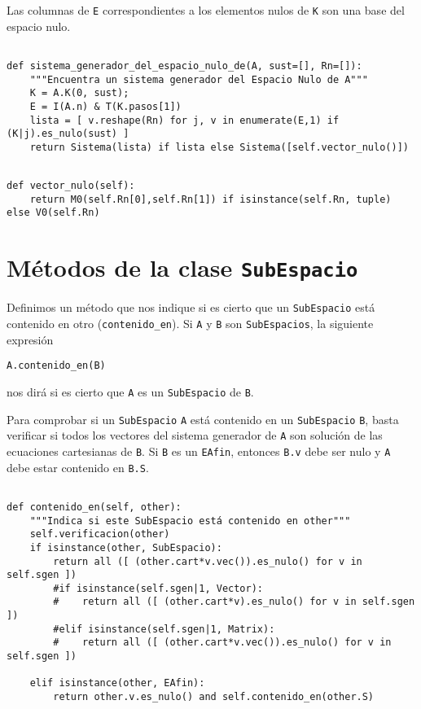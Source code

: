 \documentclass[11pt]{report}
\begin{document}
Las columnas de \texttt{E} correspondientes a los elementos nulos de \texttt{K} son
una base del espacio nulo.

\begin{verbatim}

def sistema_generador_del_espacio_nulo_de(A, sust=[], Rn=[]):
    """Encuentra un sistema generador del Espacio Nulo de A"""
    K = A.K(0, sust);
    E = I(A.n) & T(K.pasos[1])
    lista = [ v.reshape(Rn) for j, v in enumerate(E,1) if (K|j).es_nulo(sust) ]
    return Sistema(lista) if lista else Sistema([self.vector_nulo()])

\end{verbatim}

\begin{verbatim}

def vector_nulo(self):
    return M0(self.Rn[0],self.Rn[1]) if isinstance(self.Rn, tuple) else V0(self.Rn)

\end{verbatim}

\section{Métodos de la clase \texttt{SubEspacio}}
\label{sec:org3bdbb15}
Definimos un método que nos indique si es cierto que un \texttt{SubEspacio}
está contenido en otro (\texttt{contenido\_en}). Si \texttt{A} y \texttt{B} son
\texttt{SubEspacios}, la siguiente expresión
\begin{center}
  \Verb/A.contenido_en(B)/
\end{center}
nos dirá si es cierto que \texttt{A} es un \texttt{SubEspacio} de \texttt{B}.

Para comprobar si un \texttt{SubEspacio} \texttt{A} está contenido en un
\texttt{SubEspacio} \texttt{B}, basta verificar si todos los vectores del sistema
generador de \texttt{A} son solución de las ecuaciones cartesianas de \texttt{B}. Si
\texttt{B} es un \texttt{EAfin}, entonces \texttt{B.v} debe ser nulo y \texttt{A} debe estar
contenido en \texttt{B.S}.

\begin{verbatim}

def contenido_en(self, other):
    """Indica si este SubEspacio está contenido en other"""
    self.verificacion(other)
    if isinstance(other, SubEspacio):
        return all ([ (other.cart*v.vec()).es_nulo() for v in self.sgen ])
        #if isinstance(self.sgen|1, Vector):
        #    return all ([ (other.cart*v).es_nulo() for v in self.sgen ])
        #elif isinstance(self.sgen|1, Matrix):
        #    return all ([ (other.cart*v.vec()).es_nulo() for v in self.sgen ])
        
    elif isinstance(other, EAfin):
        return other.v.es_nulo() and self.contenido_en(other.S)

\end{verbatim}
\end{document}
